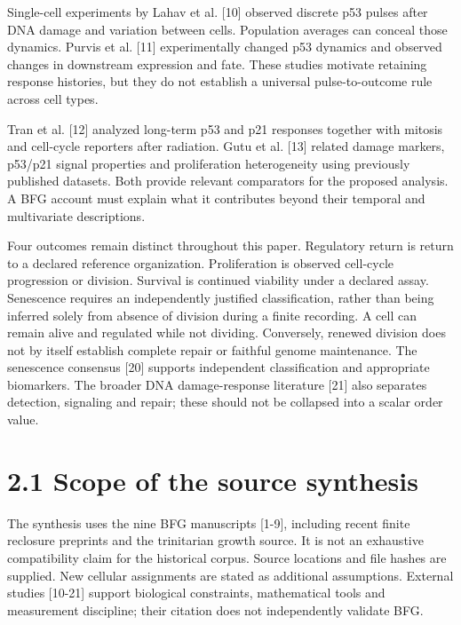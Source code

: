 \documentclass[11pt,a4paper]{article}
\begin{document}
Single-cell experiments by Lahav et al. [10] observed discrete p53 pulses after DNA damage and variation between cells. Population averages can conceal those dynamics. Purvis et al. [11] experimentally changed p53 dynamics and observed changes in downstream expression and fate. These studies motivate retaining response histories, but they do not establish a universal pulse-to-outcome rule across cell types.

Tran et al. [12] analyzed long-term p53 and p21 responses together with mitosis and cell-cycle reporters after radiation. Gutu et al. [13] related damage markers, p53/p21 signal properties and proliferation heterogeneity using previously published datasets. Both provide relevant comparators for the proposed analysis. A BFG account must explain what it contributes beyond their temporal and multivariate descriptions.

Four outcomes remain distinct throughout this paper. Regulatory return is return to a declared reference organization. Proliferation is observed cell-cycle progression or division. Survival is continued viability under a declared assay. Senescence requires an independently justified classification, rather than being inferred solely from absence of division during a finite recording. A cell can remain alive and regulated while not dividing. Conversely, renewed division does not by itself establish complete repair or faithful genome maintenance. The senescence consensus [20] supports independent classification and appropriate biomarkers. The broader DNA damage-response literature [21] also separates detection, signaling and repair; these should not be collapsed into a scalar order value.

\section*{2.1 Scope of the source synthesis}
The synthesis uses the nine BFG manuscripts [1-9], including recent finite reclosure preprints and the trinitarian growth source. It is not an exhaustive compatibility claim for the historical corpus. Source locations and file hashes are supplied. New cellular assignments are stated as additional assumptions. External studies [10-21] support biological constraints, mathematical tools and measurement discipline; their citation does not independently validate BFG.
\end{document}
